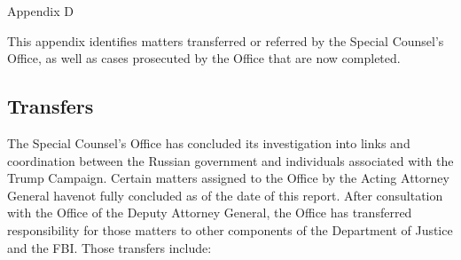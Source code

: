
\thispagestyle{empty}

\vspace*{15em}

\begin{center}

\Huge
Appendix D

\end{center}

\newpage

This appendix identifies matters transferred or referred by the Special Counsel’s Office, as well as cases prosecuted by the Office that are now completed.

\subsection{Transfers}

The Special Counsel’s Office has concluded its investigation into links and coordination between the Russian government and individuals associated with the Trump Campaign.
Certain matters assigned to the Office by the Acting Attorney General havenot fully concluded as of the date of this report.
After consultation with the Office of the Deputy Attorney General, the Office has transferred responsibility for those matters to other components of the Department of Justice and the FBI.
Those transfers include:

